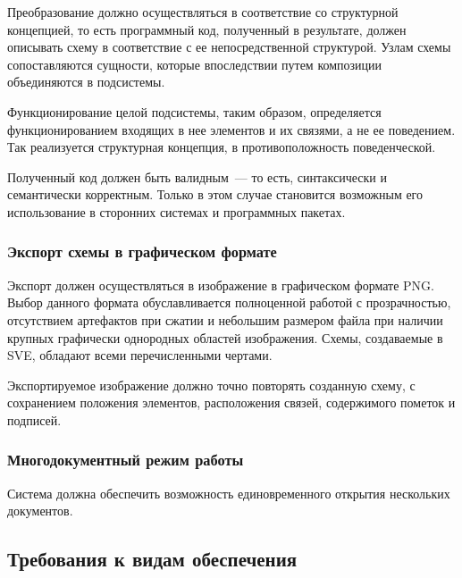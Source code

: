 Преобразование должно осуществляться в соответствие со структурной концепцией, то есть программный код, полученный в результате, должен описывать схему в соответствие с ее непосредственной структурой.
Узлам схемы сопоставляются сущности, которые впоследствии путем композиции объединяются в подсистемы.

Функционирование целой подсистемы, таким образом, определяется функционированием входящих в нее элементов и их связями, а не ее поведением.
Так реализуется структурная концепция, в противоположность поведенческой.

Полученный код должен быть валидным~--- то есть, синтаксически и семантически корректным.
Только в этом случае становится возможным его использование в сторонних системах и программных пакетах.
%
%
\subsubsection{Экспорт схемы в графическом формате}
Экспорт должен осуществляться в изображение в графическом формате PNG.
Выбор данного формата обуславливается полноценной работой с прозрачностью, отсутствием артефактов при сжатии и небольшим размером файла при наличии крупных графически однородных областей изображения.
Схемы, создаваемые в SVE, обладают всеми перечисленными чертами.

Экспортируемое изображение должно точно повторять созданную схему, с сохранением положения элементов, расположения связей, содержимого пометок и подписей.
%
%
\subsubsection{Многодокументный режим работы}
Система должна обеспечить возможность единовременного открытия нескольких документов.
%
%
%
\subsection{Требования к видам обеспечения} \label{sec:ware}

